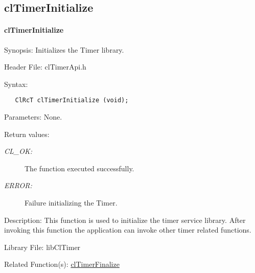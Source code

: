 \begin{flushleft}
\subsection{clTimerInitialize}
\hypertarget{pagetmr102}{}\paragraph{cl\-Timer\-Initialize}\label{pagetmr102}
\begin{Desc}
\item[Synopsis:]Initializes the Timer library.\end{Desc}
\begin{Desc}
\item[Header File:]clTimerApi.h\end{Desc}
\begin{Desc}
\item[Syntax:]

\footnotesize\begin{verbatim}   ClRcT clTimerInitialize (void);
\end{verbatim}
\normalsize
\end{Desc}
\begin{Desc}
\item[Parameters:]None.\end{Desc}
\begin{Desc}
\item[Return values:]
\begin{description}
\item[{\em CL\_\-OK:}]The function executed successfully. 
\item[{\em ERROR:}]Failure initializing the Timer.\end{description}
\end{Desc}
\begin{Desc}
\item[Description:]This function is used to initialize the timer service library. After invoking this function the application can invoke other timer 
related functions. \end{Desc}
\begin{Desc}
\item[Library File:]lib\-Cl\-Timer\end{Desc}
\begin{Desc}
\item[Related Function(s):]\hyperlink{pagetmr103}{cl\-Timer\-Finalize} \end{Desc}



\end{flushleft}
